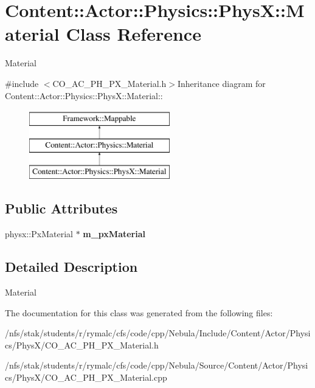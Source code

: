 \hypertarget{classContent_1_1Actor_1_1Physics_1_1PhysX_1_1Material}{
\section{Content::Actor::Physics::PhysX::Material Class Reference}
\label{classContent_1_1Actor_1_1Physics_1_1PhysX_1_1Material}
}


Material  


{\ttfamily \#include $<$CO\_\-AC\_\-PH\_\-PX\_\-Material.h$>$}Inheritance diagram for Content::Actor::Physics::PhysX::Material::\begin{figure}[H]
\begin{center}
\leavevmode
\includegraphics[height=3cm]{classContent_1_1Actor_1_1Physics_1_1PhysX_1_1Material}
\end{center}
\end{figure}
\subsection*{Public Attributes}
\begin{DoxyCompactItemize}
\item 
\hypertarget{classContent_1_1Actor_1_1Physics_1_1PhysX_1_1Material_addd68bc49172dbed25fea115cd2ace8a}{
physx::PxMaterial $\ast$ {\bfseries m\_\-pxMaterial}}
\label{classContent_1_1Actor_1_1Physics_1_1PhysX_1_1Material_addd68bc49172dbed25fea115cd2ace8a}

\end{DoxyCompactItemize}


\subsection{Detailed Description}
Material 

The documentation for this class was generated from the following files:\begin{DoxyCompactItemize}
\item 
/nfs/stak/students/r/rymalc/cfs/code/cpp/Nebula/Include/Content/Actor/Physics/PhysX/CO\_\-AC\_\-PH\_\-PX\_\-Material.h\item 
/nfs/stak/students/r/rymalc/cfs/code/cpp/Nebula/Source/Content/Actor/Physics/PhysX/CO\_\-AC\_\-PH\_\-PX\_\-Material.cpp\end{DoxyCompactItemize}
